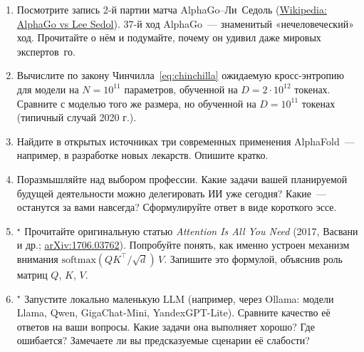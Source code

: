 \begin{tasksbox}
\begin{enumerate}\itemsep1pt
  \item Посмотрите запись 2-й партии матча AlphaGo--Ли~Седоль
        (\href{https://en.wikipedia.org/wiki/AlphaGo_versus_Lee_Sedol}{Wikipedia:
        AlphaGo vs Lee Sedol}). 37-й ход AlphaGo~--- знаменитый
        «нечеловеческий» ход. Прочитайте о нём и подумайте, почему
        он удивил даже мировых экспертов~го.
  \item Вычислите по закону Чинчилла~\eqref{eq:chinchilla} ожидаемую
        кросс-энтропию для модели на $N=10^{11}$ параметров, обученной
        на $D=2\cdot 10^{12}$ токенах. Сравните с моделью того же
        размера, но обученной на $D=10^{11}$ токенах (типичный случай
        2020 г.).
  \item Найдите в открытых источниках три современных применения
        AlphaFold~--- например, в разработке новых лекарств. Опишите
        кратко.
  \item Поразмышляйте над выбором профессии. Какие задачи вашей
        планируемой будущей деятельности можно делегировать ИИ уже
        сегодня? Какие~--- останутся за вами навсегда? Сформулируйте
        ответ в виде короткого эссе.
  \item$^{\star}$ Прочитайте оригинальную статью \emph{Attention Is
        All You Need} (2017, Васвани и др.;
        \href{https://arxiv.org/abs/1706.03762}{arXiv:1706.03762}).
        Попробуйте понять, как именно устроен механизм внимания
        $\mathrm{softmax}(QK^{\top}/\sqrt{d})\,V$. Запишите это
        формулой, объяснив роль матриц $Q$, $K$, $V$.
  \item$^{\star}$ Запустите локально маленькую LLM (например, через
        Ollama: модели Llama, Qwen, GigaChat-Mini, YandexGPT-Lite).
        Сравните качество её ответов на ваши вопросы. Какие задачи
        она выполняет хорошо? Где ошибается? Замечаете ли вы
        предсказуемые сценарии её слабости?
\end{enumerate}
\end{tasksbox}
